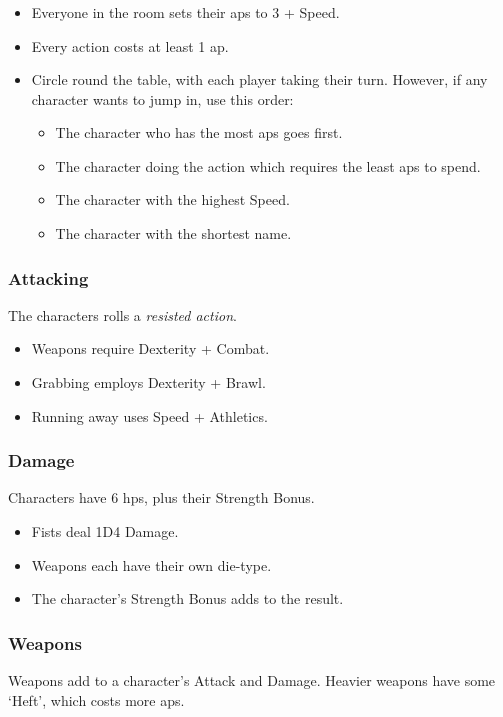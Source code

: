 \subsubsection*{}

\begin{itemize}

  \item
  Everyone in the room sets their \glspl{ap} to 3 + Speed.
  \item
  Every action costs at least 1 \gls{ap}.
  \item
  Circle round the table, with each player taking their turn.
  However, if any character wants to jump in, use this order:
  \begin{itemize}
    \item
    The character who has the most \glspl{ap} goes first.
    \item
    The character doing the action which requires the least \glspl{ap} to spend.
    \item
    The character with the highest Speed.
    \item
    The character with the shortest name.
  \end{itemize}
\end{itemize}

\subsubsection*{Attacking}

The characters rolls a \textit{resisted action}.
\begin{itemize}
  \item
  Weapons require Dexterity + Combat.
  \item
  Grabbing employs Dexterity + Brawl.
  \item
  Running away uses Speed + Athletics.
\end{itemize}

\subsubsection*{Damage}

Characters have 6 \glspl{hp}, plus their Strength Bonus.

\begin{itemize}

  \item
  Fists deal 1D4 Damage.
  \item
  Weapons each have their own die-type.
  \item
  The character's Strength Bonus adds to the result.
\end{itemize}

\subsubsection*{Weapons}

Weapons add to a character's Attack and Damage.
Heavier weapons have some `Heft', which costs more \glspl{ap}.

